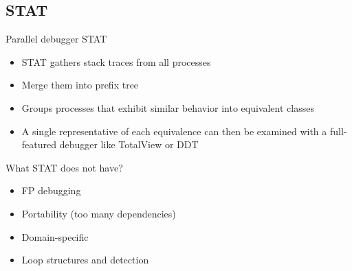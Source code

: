 \subsection{STAT}

Parallel debugger STAT\cite{stat}
\begin{itemize}
\item STAT gathers stack traces from all processes
\item Merge them into prefix tree
\item Groups processes that exhibit similar behavior into equivalent classes
\item A single representative of each equivalence can then be examined with a full-featured debugger like TotalView or DDT
\end{itemize}

What STAT does not have?

\begin{itemize}
\item FP debugging
\item Portability (too many dependencies)
\item Domain-specific
\item Loop structures and detection
\end{itemize}